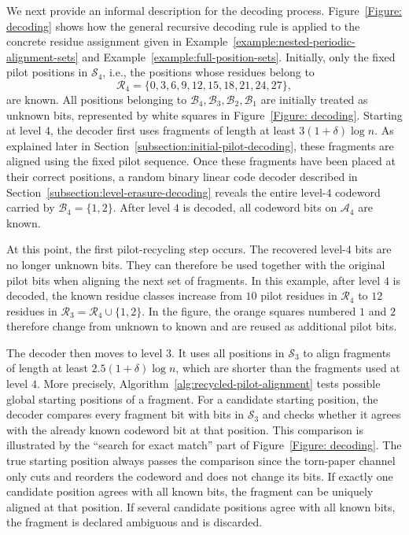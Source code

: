 \documentclass[journal,letterpaper,onecolumn,11pt]{IEEEtran}
\newcommand{\cA}{\mathcal{A}}
\newcommand{\cB}{\mathcal{B}}
\newcommand{\cR}{\mathcal{R}}
\newcommand{\cS}{\mathcal{S}}
\begin{document}
We next provide an informal description for the decoding process.
Figure~\ref{Figure: decoding} shows how the general recursive decoding rule is applied to the concrete residue assignment given in Example~\ref{example:nested-periodic-alignment-sets} and Example~\ref{example:full-position-sets}. 
Initially, only the fixed pilot positions
in \(\cS_4\), i.e., the
positions whose residues belong to
\[
\cR_4=\{0,3,6,9,12,15,18,21,24,27\},
\]
are known. 
All positions belonging to
\(\cB_4,\cB_3,\cB_2,\cB_1\) are initially treated as unknown bits, represented by white squares in Figure~\ref{Figure: decoding}.
 Starting at level \(4\), the decoder first uses fragments of length at least
\(3(1+\delta)\log n\). 
As explained later in
Section~\ref{subsection:initial-pilot-decoding}, these fragments are
aligned using the fixed pilot sequence.
Once these fragments have been placed at
their correct positions, a random binary linear code decoder described in
Section~\ref{subsection:level-erasure-decoding} reveals the entire level-\(4\) codeword
carried by
$\cB_4=\{1,2\}$.
After level \(4\) is
decoded, all codeword bits on \(\cA_4\) are known.

At this point, the first pilot-recycling step occurs. The recovered
level-\(4\) bits are no longer unknown bits.
They can therefore be
used together with the original pilot bits when aligning the next set of
fragments. 
In this example, after level \(4\) is decoded,  the known residue classes increase from $10$ pilot residues in
\(\cR_4\) to $12$ residues in
$\cR_3
=
\cR_4\cup\{1,2\}.$
In the figure, the orange squares numbered \(1\) and \(2\) therefore change from
unknown to known and are reused as additional pilot bits.

The decoder then moves to level \(3\). 
It uses all positions in \(\cS_3\) to align
fragments of length at least \(2.5(1+\delta)\log n\), which are shorter than
the fragments used at level \(4\). 
More precisely, Algorithm~\ref{alg:recycled-pilot-alignment} tests possible
global starting positions of a fragment.
For a candidate starting position,
the decoder compares every fragment bit with bits in
\(\cS_3\) and checks whether it agrees with the already known codeword
bit at that position. 
This comparison is illustrated by the
``search for exact match'' part of Figure~\ref{Figure: decoding}. 
The true starting position
always passes the comparison since the torn-paper channel only cuts and
reorders the codeword and does not change its bits. 
If exactly one
candidate position agrees with all known bits, the fragment can be uniquely aligned at that position.
If several candidate positions agree with all known bits,
the fragment is declared ambiguous and is discarded.
\end{document}
